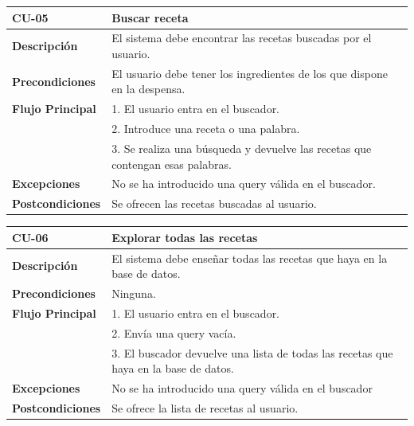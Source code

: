 \begin{table}[H]
\begin{tabular}{|m{3cm}|m{9cm}|}
\hline
\textbf{CU-05} & Buscar receta \\
\hline
\textbf{Descripción} & El sistema debe encontrar las recetas buscadas por el usuario.\\
\hline
\textbf{Precondiciones} & El usuario debe tener los ingredientes de los que dispone en la despensa.  \\
\hline
\textbf{Flujo Principal} & 
1. El usuario entra en el buscador. \\
& 2. Introduce una receta o una palabra. \\
& 3. Se realiza una búsqueda y devuelve las recetas que contengan esas palabras. \\
\hline
\textbf{Excepciones} & No se ha introducido una query válida en el buscador. \\
\hline
\textbf{Postcondiciones} & Se ofrecen las recetas buscadas al usuario.\\
\hline
\end{tabular}
\label{Tab:Cu-05}
\end{table}
\begin{table}[H]
\begin{tabular}{|m{3cm}|m{9cm}|}
\hline
\textbf{CU-06} & Explorar todas las recetas \\
\hline
\textbf{Descripción} & El sistema debe enseñar todas las recetas que haya en la base de datos.\\
\hline
\textbf{Precondiciones} & Ninguna. \\
\hline
\textbf{Flujo Principal} & 
1. El usuario entra en el buscador. \\
& 2. Envía una query vacía. \\
& 3. El buscador devuelve una lista de todas las recetas que haya en la base de datos. \\
\hline
\textbf{Excepciones} & No se ha introducido una query válida en el buscador \\
\hline
\textbf{Postcondiciones} & Se ofrece la lista de recetas al usuario.\\
\hline
\end{tabular}
\label{Tab:Cu-06}
\end{table}
